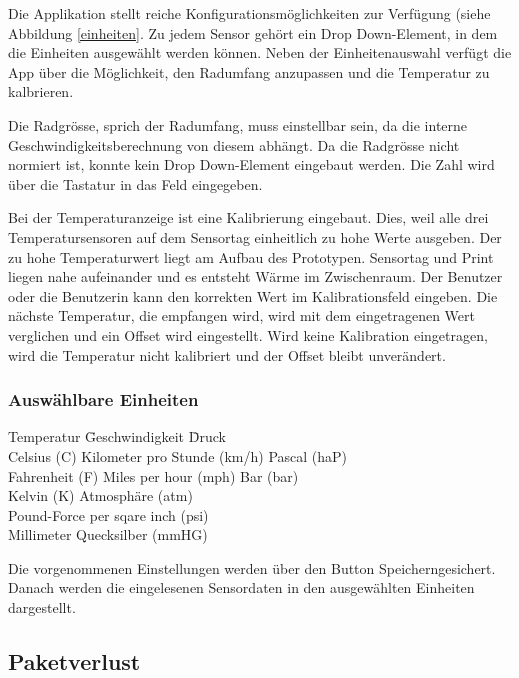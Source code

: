 Die Applikation stellt reiche Konfigurationsmöglichkeiten zur Verfügung (siehe Abbildung \ref{einheiten}. Zu jedem Sensor gehört ein Drop Down-Element, in dem die Einheiten ausgewählt werden können. Neben der Einheitenauswahl verfügt die App über die Möglichkeit, den Radumfang anzupassen und die Temperatur zu kalbrieren. 

Die Radgrösse, sprich der Radumfang, muss einstellbar sein, da die interne Geschwindigkeitsberechnung von diesem abhängt. Da die Radgrösse nicht normiert ist, konnte kein Drop Down-Element eingebaut werden. Die Zahl wird über die Tastatur in das Feld eingegeben.

Bei der Temperaturanzeige ist eine Kalibrierung eingebaut. Dies, weil alle drei Temperatursensoren auf dem Sensortag einheitlich zu hohe Werte ausgeben. Der zu hohe Temperaturwert liegt am Aufbau des Prototypen. Sensortag und Print liegen nahe aufeinander und es entsteht Wärme im Zwischenraum. Der Benutzer oder die Benutzerin kann den korrekten Wert im Kalibrationsfeld eingeben. Die nächste Temperatur, die empfangen wird, wird mit dem eingetragenen Wert verglichen und ein Offset wird eingestellt. Wird keine Kalibration eingetragen, wird die Temperatur nicht kalibriert und der Offset bleibt unverändert.

\subsubsection*{Auswählbare Einheiten}
\begin{tabbing}
    Temperatur     \quad\= Geschwindigkeit            \quad\= Druck \\[0.8ex]
    Celsius (C)    \> Kilometer pro Stunde (km/h)\> Pascal (haP)\\
    Fahrenheit (F) \> Miles per hour (mph)       \> Bar (bar)\\
    Kelvin (K)     \>                            \> Atmosph\"{a}re (atm)\\
                   \>                      \> Pound-Force per sqare inch (psi)\\
                   \>                      \> Millimeter Quecksilber (mmHG)\\
\end{tabbing} 

  
Die vorgenommenen Einstellungen werden über den Button \glqq Speichern\grqq gesichert. Danach werden die eingelesenen Sensordaten in den ausgewählten Einheiten dargestellt.

\subsection{Paketverlust}

